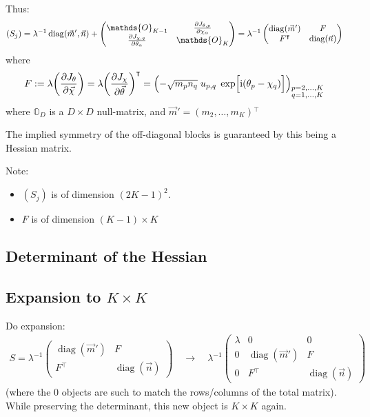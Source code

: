 \documentclass[
	english,
	a4paper,
	fontsize=10pt,
	parskip=half,
	titlepage=true,
	DIV=12,
	final
]{scrreprt}
\newcommand*{\thus}{\ensuremath{\rightarrow}\xspace}
\newcommand*{\transp}{\ensuremath{^\intercal}}
\newcommand*{\iunit}{\ensuremath{\mathrm{i}}}
\DeclareMathOperator{\diag}{diag}
\begin{document}
Thus:
\begin{align}
	(S_j)
&=
	\lambda^{-1}
	\diag(\vec{m}', \vec{n})
	+
	\begin{pmatrix}
		\mathds{O}_{K-1} & 
		\pdv{J_{\theta, p}}{\chi_{\alpha}}
		\\
		\pdv{J_{\chi, q}}{\theta_{\alpha}} &
		\mathds{O}_{K}
	\end{pmatrix}
=
	\lambda^{-1}
	\begin{pmatrix}
		\diag(\vec{m}') & F 			\\
		F\transp & \diag(\vec{n})
	\end{pmatrix}
\end{align}
where
\begin{align}
	F
&:=
	\lambda \qty( \pdv{J_{\theta}}{\vec{\chi}} ) 
	= \lambda \qty( \pdv{J_{\chi}}{\vec{\theta}} )\transp
	= \qty( -\sqrt{m_p n_q} \; u_{p,q} \; \exp[\Big. \iunit(\theta_p - \chi_q)] )_{
		\substack{p = 2, \ldots, K \\ q = 1, \ldots, K}
	}	
\label{eqn:defDetOffDiagonalF}
\end{align}
where $\mathds{O}_{D}$ is a $D \times D$ null-matrix, and $\vec{m}' = (m_2, \ldots, m_K)\transp$

The implied symmetry of the off-diagonal blocks is guaranteed by this being a Hessian matrix.

Note:
\begin{itemize}
\item $(S_j)$ is of dimension $(2K-1)^{2}$.
\item $F$ is of dimension $(K - 1) \times K$
\end{itemize}


\subsection{Determinant of the Hessian}
\subsection{Expansion to $K \times K$}
Do expansion:
\begin{align}
	S
=
	\lambda^{-1}
	\begin{pmatrix}
		\diag(\vec{m}') & F 			\\
		F\transp & \diag(\vec{n})
	\end{pmatrix}
\quad\thus\quad
	\lambda^{-1}
	\begin{pmatrix}
		\lambda		& 0					& 0			\\
		0			& \diag(\vec{m}')	& F			\\
		0			& F\transp			& \diag(\vec{n})
	\end{pmatrix}
\end{align}
(where the $0$ objects are such to match the rows/columns of the total matrix). While preserving the determinant, this new object is $K \times K$ again.
\end{document}
